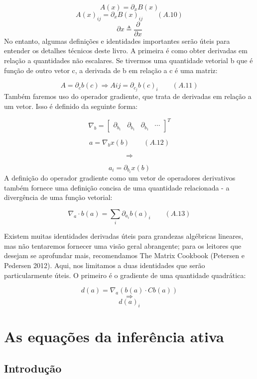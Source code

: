 \documentclass[
  12pt,
]{book}
\begin{document}
\[ A(x) = \partial_x B(x)  \]
\[ A(x)_{ij} = \partial_x B(x)_{ij} \qquad (A.10)\]
\[ \partial x \triangleq  \frac {\partial} {\partial x} \]
No entanto, algumas definições e identidades importantes serão úteis para entender os detalhes técnicos deste livro. A primeira é como obter derivadas em relação a quantidades não escalares. Se tivermos uma quantidade vetorial b que é função de outro vetor c, a derivada de b em relação a c é uma matriz:

\[ A = \partial_c b(c) \Longrightarrow A{ij} = \partial_{c_j}b(c)_i  \qquad (A.11)\]
Também faremos uso do operador gradiente, que trata de derivadas em relação a um vetor. Isso é definido da seguinte forma:

\[ \nabla_b = \begin{bmatrix} 
\partial_{b_1} &  \partial_{b_1} & \partial_{b_1} & \cdots 
\end{bmatrix}^T  \]

\[ a = \nabla_bx(b) \qquad (A.12)\]

\[ \Longrightarrow \]

\[ a_i = \partial_{b_i}x(b)\]
A definição do operador gradiente como um vetor de operadores derivativos também fornece uma definição concisa de uma quantidade relacionada - a divergência de uma função vetorial:

\[ \nabla_a \cdot b(a) = \sum_i \partial_{a_i}b(a)_i \qquad (A.13)\]

Existem muitas identidades derivadas úteis para grandezas algébricas lineares, mas não tentaremos fornecer uma visão geral abrangente; para os leitores que desejam se aprofundar mais, recomendamos The Matrix Cookbook (Petersen e Pedersen 2012). Aqui, nos limitamos a duas identidades que serão particularmente úteis. O primeiro é o gradiente de uma quantidade quadrática:

\[ d(a) = \nabla_a(b(a) \cdot Cb(a))\]
\[ \Longrightarrow\]
\[d(a)_i\]

\hypertarget{as-equauxe7uxf5es-da-inferuxeancia-ativa}{%
\chapter{As equações da inferência ativa}\label{as-equauxe7uxf5es-da-inferuxeancia-ativa}}

\hypertarget{introduuxe7uxe3o-11}{%
\section{Introdução}\label{introduuxe7uxe3o-11}}
\end{document}
